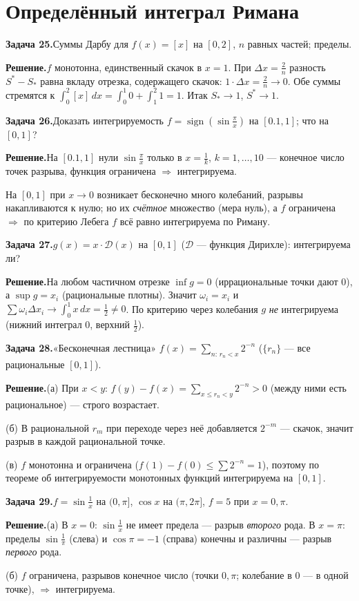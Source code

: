\documentclass[10pt,a4paper]{article}
\DeclareMathOperator{\sign}{sign}
\newcommand{\dx}{\,dx}
\renewcommand{\le}{\leqslant}
\theoremstyle{definition}
\theoremstyle{plain}
\newcommand{\writespace}{\vspace{7.5mm}}
\newcommand{\task}[2]{%
  \par\writespace\noindent
  \textbf{\textcolor{accent}{Задача #1.}}\enspace #2\par\smallskip}
\newcommand{\sol}{\par\noindent\textbf{Решение.}\enspace}
\begin{document}
\section{Определённый интеграл Римана}

\task{25}{Суммы Дарбу для $f(x)=[x]$ на $[0,2]$, $n$ равных частей; пределы.}
\sol $f$ монотонна, единственный скачок в $x=1$. При $\Delta x=\tfrac2n$ разность
$S^*-S_*$ равна вкладу отрезка, содержащего скачок: $1\cdot\Delta x=\tfrac2n\to0$. Обе суммы
стремятся к $\int_0^2[x]\dx=\int_0^1 0+\int_1^2 1=1$. Итак $S_*\to1$, $S^*\to1$.

\task{26}{Доказать интегрируемость $f=\sign(\sin\tfrac\pi x)$ на $[0.1,1]$; что на $[0,1]$?}
\sol На $[0.1,1]$ нули $\sin\tfrac\pi x$ только в $x=\tfrac1k$, $k=1,\dots,10$ — конечное число точек
разрыва, функция ограничена $\Rightarrow$ интегрируема.

На $[0,1]$ при $x\to0$ возникает бесконечно
много колебаний, разрывы накапливаются к нулю; но их \emph{счётное} множество (мера нуль), а $f$
ограничена $\Rightarrow$ по критерию Лебега $f$ всё равно интегрируема по Риману.

\task{27}{$g(x)=x\cdot\mathcal D(x)$ на $[0,1]$ ($\mathcal D$ — функция Дирихле): интегрируема ли?}
\sol На любом частичном отрезке $\inf g=0$ (иррациональные точки дают $0$), а $\sup g=x_i$
(рациональные плотны). Значит $\omega_i=x_i$ и $\sum\omega_i\Delta x_i\to\int_0^1 x\dx=\tfrac12\ne0$.
По критерию через колебания $g$ \emph{не} интегрируема (нижний интеграл $0$, верхний $\tfrac12$).

\task{28}{«Бесконечная лестница» $f(x)=\sum_{n:\,r_n<x}2^{-n}$ ($\{r_n\}$ — все рациональные $[0,1]$).}
\sol (а) При $x<y$: $f(y)-f(x)=\sum_{x\le r_n<y}2^{-n}>0$ (между ними есть рациональное) — строго
возрастает.

(б) В рациональной $r_m$ при переходе через неё добавляется $2^{-m}$ — скачок, значит
разрыв в каждой рациональной точке.

(в) $f$ монотонна и ограничена ($f(1)-f(0)\le\sum2^{-n}=1$),
поэтому по теореме об интегрируемости монотонных функций интегрируема на $[0,1]$.

\task{29}{$f=\sin\tfrac1x$ на $(0,\pi]$, $\cos x$ на $(\pi,2\pi]$, $f=5$ при $x=0,\pi$.}
\sol (а) В $x=0$: $\sin\tfrac1x$ не имеет предела — разрыв \emph{второго} рода. В $x=\pi$: пределы
$\sin\tfrac1\pi$ (слева) и $\cos\pi=-1$ (справа) конечны и различны — разрыв \emph{первого} рода.

(б) $f$ ограничена, разрывов конечное число (точки $0,\pi$; колебание в $0$ — в одной точке),
$\Rightarrow$ интегрируема.
\end{document}
